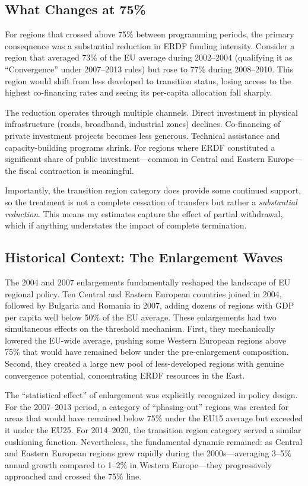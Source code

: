 \documentclass[12pt]{article}
\begin{document}
\subsection{What Changes at 75\%}

For regions that crossed above 75\% between programming periods, the primary consequence was a substantial reduction in ERDF funding intensity. Consider a region that averaged 73\% of the EU average during 2002--2004 (qualifying it as ``Convergence'' under 2007--2013 rules) but rose to 77\% during 2008--2010. This region would shift from less developed to transition status, losing access to the highest co-financing rates and seeing its per-capita allocation fall sharply.

The reduction operates through multiple channels. Direct investment in physical infrastructure (roads, broadband, industrial zones) declines. Co-financing of private investment projects becomes less generous. Technical assistance and capacity-building programs shrink. For regions where ERDF constituted a significant share of public investment---common in Central and Eastern Europe---the fiscal contraction is meaningful.

Importantly, the transition region category does provide some continued support, so the treatment is not a complete cessation of transfers but rather a \emph{substantial reduction}. This means my estimates capture the effect of partial withdrawal, which if anything understates the impact of complete termination.

\subsection{Historical Context: The Enlargement Waves}

The 2004 and 2007 enlargements fundamentally reshaped the landscape of EU regional policy. Ten Central and Eastern European countries joined in 2004, followed by Bulgaria and Romania in 2007, adding dozens of regions with GDP per capita well below 50\% of the EU average. These enlargements had two simultaneous effects on the threshold mechanism. First, they mechanically lowered the EU-wide average, pushing some Western European regions above 75\% that would have remained below under the pre-enlargement composition. Second, they created a large new pool of less-developed regions with genuine convergence potential, concentrating ERDF resources in the East.

The ``statistical effect'' of enlargement was explicitly recognized in policy design. For the 2007--2013 period, a category of ``phasing-out'' regions was created for areas that would have remained below 75\% under the EU15 average but exceeded it under the EU25. For 2014--2020, the transition region category served a similar cushioning function. Nevertheless, the fundamental dynamic remained: as Central and Eastern European regions grew rapidly during the 2000s---averaging 3--5\% annual growth compared to 1--2\% in Western Europe---they progressively approached and crossed the 75\% line.
\end{document}
